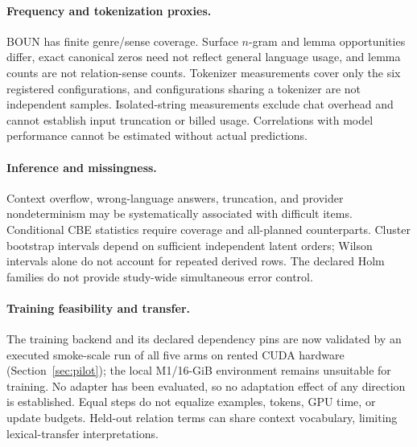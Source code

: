 \paragraph{Frequency and tokenization proxies.}
BOUN has finite genre/sense coverage. Surface $n$-gram and lemma opportunities differ, exact canonical zeros
need not reflect general language usage, and lemma counts are not relation-sense counts. Tokenizer
measurements cover only the six registered configurations, and configurations sharing a tokenizer are not
independent samples. Isolated-string measurements exclude chat overhead and cannot establish input
truncation or billed usage. Correlations with model performance cannot be estimated without actual
predictions.

\paragraph{Inference and missingness.}
Context overflow, wrong-language answers, truncation, and provider nondeterminism may be systematically
associated with difficult items. Conditional CBE statistics require coverage and all-planned counterparts.
Cluster bootstrap intervals depend on sufficient independent latent orders; Wilson intervals alone do not
account for repeated derived rows. The declared Holm families do not provide study-wide simultaneous error
control.

\paragraph{Training feasibility and transfer.}
The training backend and its declared dependency pins are now validated by an executed smoke-scale run of
all five arms on rented CUDA hardware (Section~\ref{sec:pilot}); the local M1/16-GiB environment remains
unsuitable for training. No adapter has been evaluated, so no adaptation effect of any direction is
established. Equal steps do not equalize examples, tokens, GPU time, or update budgets. Held-out relation
terms can share context vocabulary, limiting lexical-transfer interpretations.
